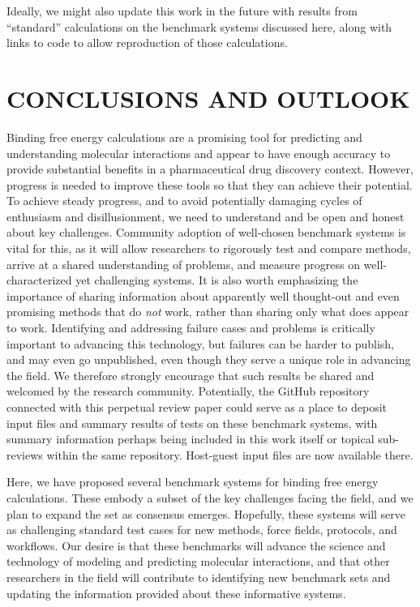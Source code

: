 \documentclass[aps,pre,twocolumn,nofootinbib,superscriptaddress,10pt, final,tightenlines]{revtex4-1}
\begin{document}
Ideally, we might also update this work in the future with results from ``standard'' calculations on the benchmark systems discussed here, along with links to code to allow reproduction of those calculations.

\section{CONCLUSIONS AND OUTLOOK}
Binding free energy calculations are a promising tool for predicting and understanding molecular interactions and appear to have enough accuracy to provide substantial benefits in a pharmaceutical drug discovery context.
However, progress is needed to improve these tools so that they can achieve their potential. To achieve steady progress, and to avoid potentially damaging cycles of enthusiasm and disillusionment, we need to understand and be open and honest about key challenges. 
Community adoption of well-chosen benchmark systems is vital for this, as it will allow researchers to rigorously test and compare methods, arrive at a shared understanding of problems, and measure progress on well-characterized yet challenging systems. 
It is also worth emphasizing the importance of sharing information about apparently well thought-out and even promising methods that do \emph{not} work, rather than sharing only what does appear to work. 
Identifying and addressing failure cases and problems is critically important to advancing this technology, but failures can be harder to publish, and may even go unpublished, even though they serve a unique role in advancing the field. 
We therefore strongly encourage that such results be shared and welcomed by the research community. 
Potentially, the GitHub repository connected with this perpetual review paper could serve as a place to deposit input files and summary results of tests on these benchmark systems, with summary information perhaps being included in this work itself or topical sub-reviews within the same repository.
Host-guest input files are now available there.

Here, we have proposed several benchmark systems for binding free energy calculations. 
These embody a subset of the key challenges facing the field, and we plan to expand the set as consensus emerges. 
Hopefully, these systems will serve as challenging standard test cases for new methods, force fields, protocols, and workflows. 
Our desire is that these benchmarks will advance the science and technology of modeling and predicting molecular interactions, and that other researchers in the field will contribute to identifying new benchmark sets and updating the information provided about these informative systems.
\end{document}
